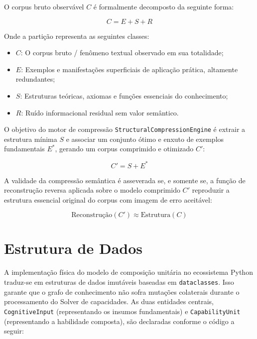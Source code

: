 \documentclass[12pt,a4paper,oneside]{abntex2}
\begin{document}
O corpus bruto observável $C$ é formalmente decomposto da seguinte forma:

\begin{equation}
C = E + S + R
\end{equation}

Onde a partição representa as seguintes classes:
\begin{itemize}
    \item $C$: O corpus bruto / fenômeno textual observado em sua totalidade;
    \item $E$: Exemplos e manifestações superficiais de aplicação prática, altamente redundantes;
    \item $S$: Estruturas teóricas, axiomas e funções essenciais do conhecimento;
    \item $R$: Ruído informacional residual sem valor semântico.
\end{itemize}

O objetivo do motor de compressão \texttt{StructuralCompressionEngine} é extrair a estrutura mínima $S$ e associar um conjunto ótimo e enxuto de exemplos fundamentais $E^*$, gerando um corpus comprimido e otimizado $C'$:

\begin{equation}
C' = S + E^*
\end{equation}

A validade da compressão semântica é asseverada se, e somente se, a função de reconstrução reversa aplicada sobre o modelo comprimido $C'$ reproduzir a estrutura essencial original do corpus com imagem de erro aceitável:

\begin{equation}
\text{Reconstrução}(C') \approx \text{Estrutura}(C)
\end{equation}

\section{Estrutura de Dados}

A implementação física do modelo de composição unitária no ecossistema Python traduz-se em estruturas de dados imutáveis baseadas em \texttt{dataclasses}. Isso garante que o grafo de conhecimento não sofra mutações colaterais durante o processamento do Solver de capacidades. As duas entidades centrais, \texttt{CognitiveInput} (representando os insumos fundamentais) e \texttt{CapabilityUnit} (representando a habilidade composta), são declaradas conforme o código a seguir:
\end{document}
